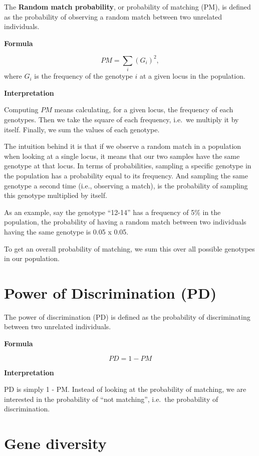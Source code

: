 \documentclass[
]{book}
\begin{document}
The \textbf{Random match probability}, or probability of matching (PM), is defined as
the probability of observing a random match between two unrelated individuals.

\textbf{Formula}

\[
PM = \sum_i (G_i)^2,
\]
where \(G_i\) is the frequency of the genotype \(i\) at a given locus in the population.

\textbf{Interpretation}

Computing \(PM\) means calculating, for a given locus, the frequency of each
genotypes. Then we take the square of each frequency, i.e.~we multiply it by itself.
Finally, we sum the values of each genotype.

The intuition behind it is that if we observe a random match in a population when looking
at a single locus, it means that our two samples have the same genotype at that locus.
In terms of probabilities, sampling a specific genotype in the population has a probability
equal to its frequency. And sampling the same genotype a second time (i.e., observing a match),
is the probability of sampling this genotype multiplied by itself.

As an example, say the genotype ``12-14'' has a frequency of 5\% in the population, the probability of
having a random match between two individuals having the same genotype is 0.05 x 0.05.

To get an overall probability of matching, we sum this over all possible genotypes
in our population.

\hypertarget{power-of-discrimination-pd}{%
\section{Power of Discrimination (PD)}\label{power-of-discrimination-pd}}

The power of discrimination (PD) is defined as the probability of
discriminating between two unrelated individuals.

\textbf{Formula}

\[
PD = 1 - PM
\]

\textbf{Interpretation}

PD is simply 1 - PM. Instead of looking at the probability of matching, we are
interested in the probability of ``not matching'', i.e.~the probability of discrimination.

\hypertarget{gene-diversity}{%
\section{Gene diversity}\label{gene-diversity}}
\end{document}
